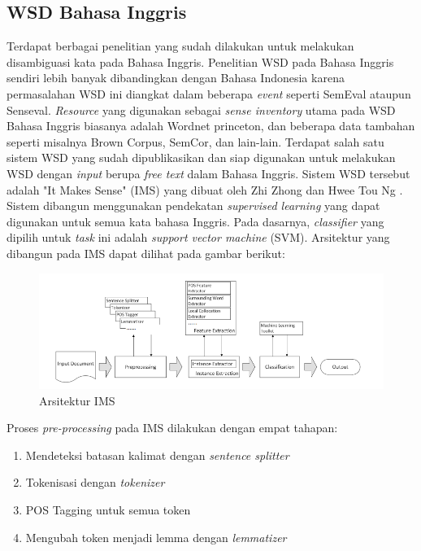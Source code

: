 \subsection{WSD Bahasa Inggris}
Terdapat berbagai penelitian yang sudah dilakukan untuk melakukan disambiguasi kata pada Bahasa Inggris. Penelitian WSD pada Bahasa Inggris sendiri lebih banyak dibandingkan dengan Bahasa Indonesia karena permasalahan WSD ini diangkat dalam beberapa \textit{event} seperti SemEval ataupun Senseval. \textit{Resource} yang digunakan sebagai \textit{sense inventory} utama pada WSD Bahasa Inggris biasanya adalah Wordnet princeton, dan beberapa data tambahan seperti misalnya Brown Corpus, SemCor, dan lain-lain. Terdapat salah satu sistem WSD yang sudah dipublikasikan dan siap digunakan untuk melakukan WSD dengan \textit{input} berupa \textit{free text} dalam Bahasa Inggris. Sistem WSD tersebut adalah "It Makes Sense" (IMS) yang dibuat oleh Zhi Zhong dan Hwee Tou Ng \citep{zhong2010makes}. Sistem  dibangun menggunakan pendekatan \textit{supervised learning} yang dapat digunakan untuk semua kata bahasa Inggris. Pada dasarnya, \textit{classifier} yang dipilih untuk \textit{task} ini adalah \textit{support vector machine} (SVM). Arsitektur yang dibangun pada IMS dapat dilihat pada gambar berikut:

\begin{figure}
	\centering
	\includegraphics[width=1\linewidth]{adit_pics/Arsitektur-IMS}
	\caption{Arsitektur IMS}
	\label{fig:Arsitektur-IMS}
\end{figure}

Proses \textit{pre-processing} pada IMS dilakukan dengan empat tahapan:
\begin{enumerate}
	\item Mendeteksi batasan kalimat dengan \textit{sentence splitter}
	\item Tokenisasi dengan \textit{tokenizer}
	\item POS Tagging untuk semua token
	\item Mengubah token menjadi lemma dengan \textit{lemmatizer}
\end{enumerate}

